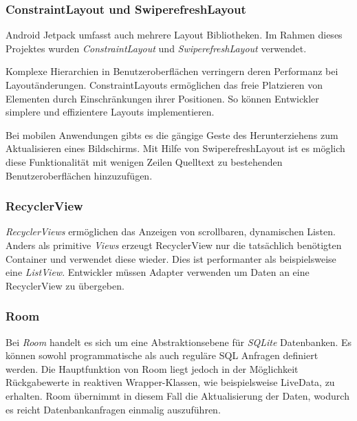 \documentclass[a4paper, 11pt]{article}
\begin{document}
\subsubsection{ConstraintLayout und SwiperefreshLayout}
\label{subsubsec:app:jetpack:layouts}
Android Jetpack umfasst auch mehrere Layout Bibliotheken.
Im Rahmen dieses Projektes wurden \textit{ConstraintLayout} und \textit{SwiperefreshLayout} verwendet.

Komplexe Hierarchien in Benutzeroberflächen verringern deren Performanz bei Layoutänderungen.
ConstraintLayouts ermöglichen das freie Platzieren von Elementen durch Einschränkungen ihrer Positionen.
So können Entwickler simplere und effizientere Layouts implementieren.

Bei mobilen Anwendungen gibts es die gängige Geste des Herunterziehens zum Aktualisieren eines Bildschirms.
Mit Hilfe von SwiperefreshLayout ist es möglich diese Funktionalität mit wenigen Zeilen Quelltext zu bestehenden Benutzeroberflächen hinzuzufügen.

\subsubsection{RecyclerView}
\label{subsubsec:app:jetpack:recyclerview}
\textit{RecyclerViews} ermöglichen das Anzeigen von scrollbaren, dynamischen Listen.
Anders als primitive \textit{Views} erzeugt RecyclerView nur die tatsächlich benötigten Container und verwendet diese wieder.
Dies ist performanter als beispielsweise eine \textit{ListView}.
Entwickler müssen Adapter verwenden um Daten an eine RecyclerView zu übergeben.

\subsubsection{Room}
\label{subsubsec:app:jetpack:room}
Bei \textit{Room} handelt es sich um eine Abstraktionsebene für \textit{SQLite} Datenbanken.
Es können sowohl programmatische als auch reguläre SQL Anfragen definiert werden.
Die Hauptfunktion von Room liegt jedoch in der Möglichkeit Rückgabewerte in reaktiven Wrapper-Klassen, wie beispielsweise LiveData, zu erhalten.
Room übernimmt in diesem Fall die Aktualisierung der Daten, wodurch es reicht Datenbankanfragen einmalig auszuführen.
\end{document}
